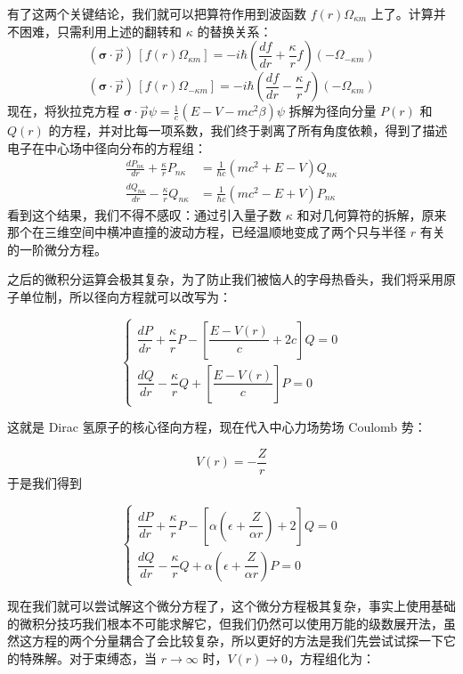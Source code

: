 \documentclass[UTF8]{ctexbook}
\begin{document}
有了这两个关键结论，我们就可以把算符作用到波函数 $f(r)\Omega_{\kappa m}$ 上了。计算并不困难，只需利用上述的翻转和 $\kappa$ 的替换关系：
\[
(\boldsymbol\sigma\cdot\vec{p})\,[f(r)\Omega_{\kappa m}] = -i\hbar\left(\frac{df}{dr}+\frac{\kappa}{r}f\right)(-\Omega_{-\kappa m})
\]
\[
(\boldsymbol\sigma\cdot\vec{p})\,[f(r)\Omega_{-\kappa m}] = -i\hbar\left(\frac{df}{dr}-\frac{\kappa}{r}f\right)(-\Omega_{\kappa m})
\]
现在，将狄拉克方程 $\boldsymbol{\sigma}\cdot\vec{p} \psi = \frac{1}{c}(E-V-mc^2\beta)\psi$ 拆解为径向分量 $P(r)$ 和 $Q(r)$ 的方程，并对比每一项系数，我们终于剥离了所有角度依赖，得到了描述电子在中心场中径向分布的方程组：
\begin{align*}
\frac{dP_{n\kappa}}{dr}+\frac{\kappa}{r}P_{n\kappa} &= \frac{1}{\hbar c}\left(mc^2+E-V\right)Q_{n\kappa} \\
\frac{dQ_{n\kappa}}{dr}-\frac{\kappa}{r}Q_{n\kappa} &= \frac{1}{\hbar c}\left(mc^2-E+V\right)P_{n\kappa}
\end{align*}
看到这个结果，我们不得不感叹：通过引入量子数 $\kappa$ 和对几何算符的拆解，原来那个在三维空间中横冲直撞的波动方程，已经温顺地变成了两个只与半径 $r$ 有关的一阶微分方程。






之后的微积分运算会极其复杂，为了防止我们被恼人的字母热昏头，我们将采用原子单位制，所以径向方程就可以改写为：

\[
\begin{cases}
\dfrac{dP}{dr} + \dfrac{\kappa}{r} P - \left[ \dfrac{E - V(r)}{c} + 2c \right] Q = 0 \\[1.2em]
\dfrac{dQ}{dr} - \dfrac{\kappa}{r} Q + \left[ \dfrac{E - V(r)}{c} \right] P = 0
\end{cases}
\]

这就是 Dirac 氢原子的核心径向方程，现在代入中心力场势场 Coulomb 势：

\[
V(r) = -\frac{Z}{r}
\]
于是我们得到

\[
\begin{cases}
\dfrac{dP}{dr} + \dfrac{\kappa}{r} P - \left[ \alpha \left(\epsilon + \dfrac{Z}{\alpha r}\right) + 2 \right] Q = 0 \\[1.2em]
\dfrac{dQ}{dr} - \dfrac{\kappa}{r} Q + \alpha \left(\epsilon + \dfrac{Z}{\alpha r}\right) P = 0
\end{cases}
\]

现在我们就可以尝试解这个微分方程了，这个微分方程极其复杂，事实上使用基础的微积分技巧我们根本不可能求解它，但我们仍然可以使用万能的级数展开法，虽然这方程的两个分量耦合了会比较复杂，所以更好的方法是我们先尝试试探一下它的特殊解。对于束缚态，当 \(r \to \infty\) 时，\(V(r) \to 0\)，方程组化为：
\end{document}
